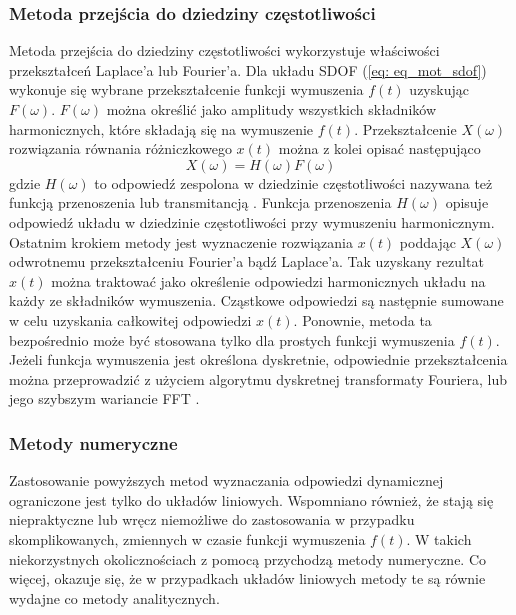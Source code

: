 \subsubsection{Metoda przejścia do dziedziny częstotliwości}

Metoda przejścia do dziedziny częstotliwości  wykorzystuje właściwości przekształceń Laplace'a lub Fourier'a. Dla układu SDOF (\ref{eq: eq_mot_sdof}) wykonuje się wybrane przekształcenie funkcji wymuszenia $f(t)$ uzyskując $F(\omega)$. $F(\omega)$ można określić jako amplitudy wszystkich składników harmonicznych, które składają się na wymuszenie $f(t)$. Przekształcenie $X(\omega)$ rozwiązania równania różniczkowego $x(t)$ można z kolei opisać następująco
\begin{equation}
	X(\omega)=H(\omega)F(\omega)
\end{equation}
gdzie $H(\omega)$ to odpowiedź zespolona w dziedzinie częstotliwości nazywana też funkcją przenoszenia lub transmitancją . Funkcja przenoszenia $H(\omega)$ opisuje odpowiedź układu w dziedzinie częstotliwości przy wymuszeniu harmonicznym. Ostatnim krokiem metody jest wyznaczenie rozwiązania $x(t)$ poddając $X(\omega)$ odwrotnemu przekształceniu Fourier'a bądź Laplace'a. Tak uzyskany rezultat $x(t)$ można traktować jako określenie odpowiedzi harmonicznych układu na każdy ze składników wymuszenia. Cząstkowe odpowiedzi są następnie sumowane w celu uzyskania całkowitej odpowiedzi $x(t)$. Ponownie, metoda ta bezpośrednio może być stosowana tylko dla prostych funkcji wymuszenia $f(t)$. Jeżeli funkcja wymuszenia jest określona dyskretnie, odpowiednie przekształcenia można przeprowadzić z użyciem algorytmu dyskretnej transformaty Fouriera, lub jego szybszym wariancie FFT .

\subsubsection{Metody numeryczne}

Zastosowanie powyższych metod wyznaczania odpowiedzi dynamicznej ograniczone jest tylko do układów liniowych. Wspomniano również, że stają się niepraktyczne lub wręcz niemożliwe do zastosowania w przypadku skomplikowanych, zmiennych w czasie funkcji wymuszenia $f(t)$. W takich niekorzystnych okolicznościach z pomocą przychodzą metody numeryczne. Co więcej, okazuje się, że w przypadkach układów liniowych metody te są równie wydajne co metody analitycznych. 

